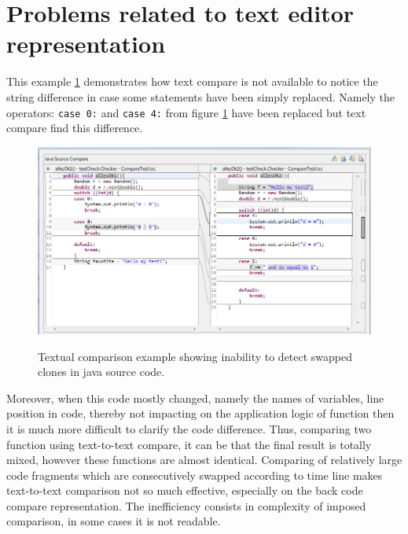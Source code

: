 \documentclass{report}
\begin{document}
\section{Problems related to text editor representation}
This example \ref{fig:text-to-text-compare-shifted} demonstrates how text compare is not available to notice the string difference in case some statements have been simply replaced. Namely the operators: \texttt{case 0:} and \texttt{case 4:} from figure \ref{fig:text-to-text-compare-shifted} have been replaced but text compare find this difference. 
\begin{figure}[h]
  \centering
  \includegraphics[scale = 0.5]{Figures/text-to-text/text-compare-shifted.png}\\[0.1cm]
  \caption[Textual comparison example showing inability to detect swapped clones]{Textual comparison example showing inability to detect swapped clones in java source code.}
  \label{fig:text-to-text-compare-shifted}
\end{figure}



Moreover, when this code mostly changed, namely the names of variables, line position in code, thereby not impacting on the application logic of function then it is much more difficult to clarify the code difference. Thus, comparing two function using text-to-text compare, it can be that the final result is totally mixed, however these functions are almost identical. Comparing of relatively large code fragments which are consecutively swapped according to time line makes text-to-text comparison not so much effective, especially on the back code compare representation. The inefficiency consists in complexity of imposed comparison, in some cases it is not readable. 
\end{document}
